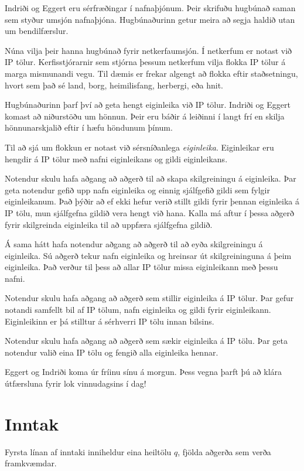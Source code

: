 
Indriði og Eggert eru sérfræðingar í nafnaþjónum.
Þeir skrifuðu hugbúnað saman sem styður umsjón nafnaþjóna.
Hugbúnaðurinn getur meira að segja haldið utan um bendilfærslur.

Núna vilja þeir hanna hugbúnað fyrir netkerfaumsjón.
Í netkerfum er notast við IP tölur.
Kerfisstjórarnir sem stjórna þessum netkerfum vilja flokka IP tölur á marga mismunandi vegu.
Til dæmis er frekar algengt að flokka eftir staðsetningu, hvort sem það sé land, borg, heimilisfang, herbergi, eða hnit.

Hugbúnaðurinn þarf því að geta hengt eiginleika við IP tölur.
Indriði og Eggert komast að niðurstöðu um hönnun.
Þeir eru báðir á leiðinni í langt frí en skilja hönnunarskjalið eftir í hæfu höndunum þínum.

Til að sjá um flokkun er notast við sérsníðanlega \emph{eiginleika}.
Eiginleikar eru hengdir á IP tölur með nafni eiginleikans og gildi eiginleikans.

Notendur skulu hafa aðgang að aðgerð til að skapa skilgreiningu á eiginleika.
Þar geta notendur gefið upp nafn eiginleika og einnig sjálfgefið gildi sem fylgir eiginleikanum.
Það þýðir að ef ekki hefur verið stillt gildi fyrir þennan eiginleika á IP tölu, mun sjálfgefna gildið vera hengt við hana.
Kalla má aftur í þessa aðgerð fyrir skilgreinda eiginleika til að uppfæra sjálfgefna gildið.

Á sama hátt hafa notendur aðgang að aðgerð til að eyða skilgreiningu á eiginleika.
Sú aðgerð tekur nafn eiginleika og hreinsar út skilgreininguna á þeim eiginleika.
Það verður til þess að allar IP tölur missa eiginleikann með þessu nafni.

Notendur skulu hafa aðgang að aðgerð sem stillir eiginleika á IP tölur.
Þar gefur notandi samfellt bil af IP tölum, nafn eiginleika og gildi fyrir eiginleikann.
Eiginleikinn er þá stilltur á sérhverri IP tölu innan bilsins.

Notendur skulu hafa aðgang að aðgerð sem sækir eiginleika á IP tölu.
Þar geta notendur valið eina IP tölu og fengið alla eiginleika hennar.

Eggert og Indriði koma úr fríinu sínu á morgun.
Þess vegna þarft þú að klára útfærsluna fyrir lok vinnudagsins í dag!

\section*{Inntak}
Fyrsta línan af inntaki inniheldur eina heiltölu $q$, fjölda aðgerða sem verða framkvæmdar.

